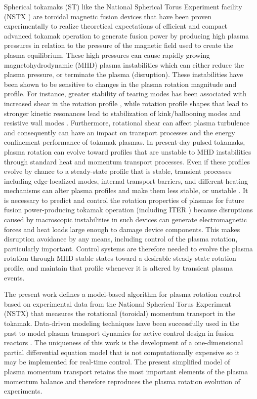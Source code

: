 \documentclass[12pt]{iopart}
\begin{document}
Spherical tokamaks (ST) like the National Spherical Torus Experiment facility (NSTX  \cite{Ono00}) are toroidal magnetic fusion devices that have been proven experimentally to realize theoretical expectations of efficient and compact advanced tokamak operation to generate fusion power by producing high plasma pressures in relation to the pressure of the magnetic field used to create the plasma equilibrium. These high pressures can cause rapidly growing magnetohydrodynamic (MHD) plasma instabilities which can either reduce the plasma pressure, or terminate the plasma (disruption). 
These instabilities have been shown to be sensitive to changes in the plasma
rotation magnitude and profile. For instance, greater stability of tearing modes
has been associated with increased shear in the rotation profile
\cite{Gerhardt09, Park13}, while rotation profile shapes that lead to stronger
kinetic resonances lead to stabilization of kink/ballooning modes and resistive
wall modes \cite{Sabbagh10, Berkery10}. Furthermore, rotational shear can affect
plasma turbulence and consequently can have an impact on transport processes and
the energy confinement performance of tokamak plasmas. In present-day pulsed
tokamaks, plasma rotation can evolve toward profiles that are unstable to MHD
instabilities through standard heat and momentum transport processes.
%
Even if these profiles evolve by chance to a steady-state profile that is
stable, transient processes including edge-localized modes, internal transport
barriers, and different heating mechanisms can alter plasma profiles and make
them less stable, or unstable \cite{Sabbagh13}.
%
It is necessary to predict and control the rotation properties of
plasmas for future fusion power-producing tokamak operation (including ITER
\cite{Hender07}) because disruptions caused by macroscopic instabilities in such
devices can generate electromagnetic forces and heat loads large enough to
damage device components.
%
This makes disruption avoidance by any means, including control of the plasma
rotation, particularly important.
%
Control systems are therefore needed to evolve the plasma
rotation through MHD stable states toward a desirable steady-state rotation
profile, and maintain that profile whenever it is altered by transient plasma
events.
%

The present work defines a model-based algorithm for plasma rotation control based on experimental data from the National Spherical Torus Experiment (NSTX) \cite{Ono00} that measures the rotational (toroidal) momentum transport in the tokamak. Data-driven modeling techniques have been successfully used in the past to model plasma transport dynamics for active control design in fusion reactors \cite{Moreau13, Boyer133, Boyer144, Barton12}. The uniqueness of this work is the development of a one-dimensional partial differential equation model that is not computationally expensive so it may be implemented for real-time control.  
The present simplified model of plasma momentum transport retains the most important elements of the plasma momentum balance and therefore reproduces the plasma rotation evolution of experiments.
 
\end{document}

